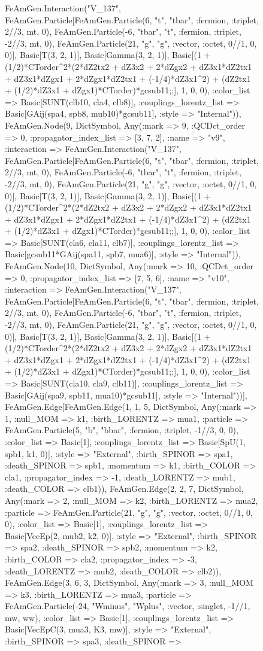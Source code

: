 \documentclass{revtex4}
\begin{document}
\begin{figure}[!htb]
\begin{center}
{FeAmGen.Interaction("V_137", FeAmGen.Particle[FeAmGen.Particle(6, "t", "tbar", :fermion, :triplet, 2//3, mt, 0), FeAmGen.Particle(-6, "tbar", "t", :fermion, :triplet, -2//3, mt, 0), FeAmGen.Particle(21, "g", "g", :vector, :octet, 0//1, 0, 0)], Basic[T(3, 2, 1)], Basic[Gamma(3, 2, 1)], Basic[(1 + (1/2)*CTorder^2*(2*dZ2tx2 + dZ3x2 + 2*dZgx2 + dZ3x1*dZ2tx1 + dZ3x1*dZgx1 + 2*dZgx1*dZ2tx1 + (-1/4)*dZ3x1^2) + (dZ2tx1 + (1/2)*dZ3x1 + dZgx1)*CTorder)*gcsub11;;], 1, 0, 0), :color_list => Basic[SUNT(clb10, cla4, clb8)], :couplings_lorentz_list => Basic[GAij(spa4, spb8, mub10)*gcsub11], :style => "Internal")), FeAmGen.Node(9, Dict{Symbol, Any}(:mark => 9, :QCDct_order => 0, :propagator_index_list => [3, 7, 2], :name => "v9", :interaction => FeAmGen.Interaction("V_137", FeAmGen.Particle[FeAmGen.Particle(6, "t", "tbar", :fermion, :triplet, 2//3, mt, 0), FeAmGen.Particle(-6, "tbar", "t", :fermion, :triplet, -2//3, mt, 0), FeAmGen.Particle(21, "g", "g", :vector, :octet, 0//1, 0, 0)], Basic[T(3, 2, 1)], Basic[Gamma(3, 2, 1)], Basic[(1 + (1/2)*CTorder^2*(2*dZ2tx2 + dZ3x2 + 2*dZgx2 + dZ3x1*dZ2tx1 + dZ3x1*dZgx1 + 2*dZgx1*dZ2tx1 + (-1/4)*dZ3x1^2) + (dZ2tx1 + (1/2)*dZ3x1 + dZgx1)*CTorder)*gcsub11;;], 1, 0, 0), :color_list => Basic[SUNT(cla6, cla11, clb7)], :couplings_lorentz_list => Basic[gcsub11*GAij(spa11, spb7, mua6)], :style => "Internal")), FeAmGen.Node(10, Dict{Symbol, Any}(:mark => 10, :QCDct_order => 0, :propagator_index_list => [7, 5, 6], :name => "v10", :interaction => FeAmGen.Interaction("V_137", FeAmGen.Particle[FeAmGen.Particle(6, "t", "tbar", :fermion, :triplet, 2//3, mt, 0), FeAmGen.Particle(-6, "tbar", "t", :fermion, :triplet, -2//3, mt, 0), FeAmGen.Particle(21, "g", "g", :vector, :octet, 0//1, 0, 0)], Basic[T(3, 2, 1)], Basic[Gamma(3, 2, 1)], Basic[(1 + (1/2)*CTorder^2*(2*dZ2tx2 + dZ3x2 + 2*dZgx2 + dZ3x1*dZ2tx1 + dZ3x1*dZgx1 + 2*dZgx1*dZ2tx1 + (-1/4)*dZ3x1^2) + (dZ2tx1 + (1/2)*dZ3x1 + dZgx1)*CTorder)*gcsub11;;], 1, 0, 0), :color_list => Basic[SUNT(cla10, cla9, clb11)], :couplings_lorentz_list => Basic[GAij(spa9, spb11, mua10)*gcsub11], :style => "Internal"))], FeAmGen.Edge[FeAmGen.Edge(1, 1, 5, Dict{Symbol, Any}(:mark => 1, :null_MOM => k1, :birth_LORENTZ => mua1, :particle => FeAmGen.Particle(5, "b", "bbar", :fermion, :triplet, -1//3, 0, 0), :color_list => Basic[1], :couplings_lorentz_list => Basic[SpU(1, spb1, k1, 0)], :style => "External", :birth_SPINOR => spa1, :death_SPINOR => spb1, :momentum => k1, :birth_COLOR => cla1, :propagator_index => -1, :death_LORENTZ => mub1, :death_COLOR => clb1)), FeAmGen.Edge(2, 2, 7, Dict{Symbol, Any}(:mark => 2, :null_MOM => k2, :birth_LORENTZ => mua2, :particle => FeAmGen.Particle(21, "g", "g", :vector, :octet, 0//1, 0, 0), :color_list => Basic[1], :couplings_lorentz_list => Basic[VecEp(2, mub2, k2, 0)], :style => "External", :birth_SPINOR => spa2, :death_SPINOR => spb2, :momentum => k2, :birth_COLOR => cla2, :propagator_index => -3, :death_LORENTZ => mub2, :death_COLOR => clb2)), FeAmGen.Edge(3, 6, 3, Dict{Symbol, Any}(:mark => 3, :null_MOM => k3, :birth_LORENTZ => mua3, :particle => FeAmGen.Particle(-24, "Wminus", "Wplus", :vector, :singlet, -1//1, mw, ww), :color_list => Basic[1], :couplings_lorentz_list => Basic[VecEpC(3, mua3, K3, mw)], :style => "External", :birth_SPINOR => spa3, :death_SPINOR => }
\end{center}
\end{figure}
\end{document}
